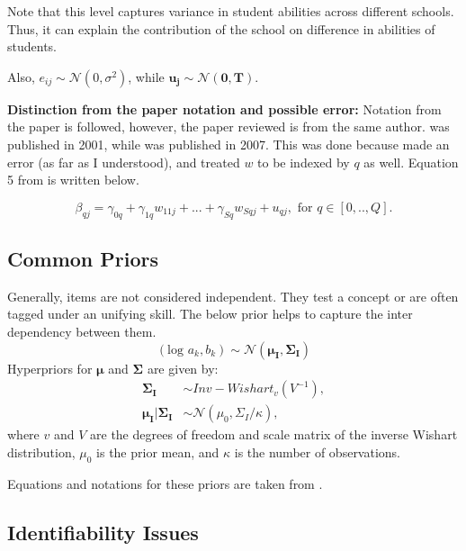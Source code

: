 \documentclass[12pt]{article}
\begin{document}
Note that this level captures variance in student abilities across different schools. Thus, it can explain the contribution of the school on difference in abilities of students.

Also, $e_{ij} \sim \mathcal{N}(0, \sigma^2)$, while $\boldsymbol{u_j} \sim \mathcal{N}(\boldsymbol{0}, \boldsymbol{T})$.

\textbf{Distinction from the paper notation and possible error:}
Notation from the paper \cite{fox2007multilevel} is followed, however, the paper reviewed is \cite{fox2001bayesian} from the same author. \cite{fox2001bayesian} was published in 2001, while \cite{fox2007multilevel} was published in 2007. This was done because \cite{fox2001bayesian} made an error (as far as I understood), and treated $w$ to be indexed by $q$ as well. Equation 5 from \cite{fox2001bayesian} is written below.

\begin{equation*}
    \beta_{qj} = \gamma_{0q} + \gamma_{1q}w_{11j} + ... + \gamma_{Sq}w_{Sqj} + u_{qj}, \text{ for } q\in [0,.., Q].
\end{equation*}

\subsection{Common Priors}
Generally, items are not considered independent. They test a concept or are often tagged under an unifying skill. The below prior helps to capture the inter dependency between them.
\begin{equation*}
    (\text{log }a_k, b_k) \sim \mathcal{N}(\boldsymbol{\mu_I}, \boldsymbol{\Sigma_I})
\end{equation*}
Hyperpriors for $\boldsymbol{\mu}$ and $\boldsymbol{\Sigma}$ are given by:
\begin{align*}
    \boldsymbol{\Sigma_I} & \sim Inv-Wishart_v(V^{-1}),\\
    \boldsymbol{\mu_I}|\boldsymbol{\Sigma_I} & \sim \mathcal{N}(\mu_0, \Sigma_I/\kappa),
\end{align*}
where $v$ and $V$ are the degrees of freedom and scale matrix of the inverse Wishart distribution, $\mu_0$ is the prior mean, and $\kappa$ is the number of observations.

Equations and notations for these priors are taken from \cite{fox2007multilevel}.

\subsection{Identifiability Issues}
\end{document}

